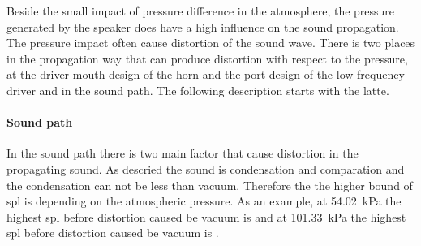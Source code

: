 Beside the small impact of pressure difference in the atmosphere, the pressure generated by the speaker does have a high influence on the sound propagation. The pressure impact often cause distortion of the sound wave. There is two places in the propagation way that can produce distortion with respect to the pressure, at the driver mouth design of the horn \citep{czerwinski1999air} and the port design of the low frequency driver \citep{vanderkooy1998nonlinearities} and in the sound path. The following description starts with the latte.

\paragraph{Sound path} In the sound path there is two main factor that cause distortion in the propagating sound. As descried the sound is condensation and comparation and the condensation can not be less than vacuum. Therefore the the higher bound of \gls{spl} is depending on the atmospheric pressure. As an example, at \SI{54.02}{\kilo\pascal} the highest \gls{spl} before distortion caused be vacuum is  and at \SI{101.33}{\kilo\pascal} the highest \gls{spl} before distortion caused be vacuum is . 

